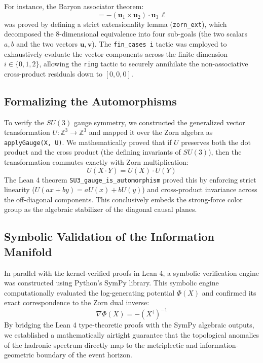 \documentclass[11pt,a4paper]{article}
\begin{document}
For instance, the Baryon associator theorem:
\begin{equation}
[N_{\text{upper}}(u_1), N_{\text{upper}}(u_2), N_{\text{upper}}(u_3)] = -(\mathbf{u}_1 \times \mathbf{u}_2) \cdot \mathbf{u}_3 \, \ell
\end{equation}
was proved by defining a strict extensionality lemma (\texttt{zorn\_ext}), which decomposed the 8-dimensional equivalence into four sub-goals (the two scalars $a,b$ and the two vectors $\mathbf{u},\mathbf{v}$). The \texttt{fin\_cases i} tactic was employed to exhaustively evaluate the vector components across the finite dimension $i \in \{0, 1, 2\}$, allowing the \texttt{ring} tactic to securely annihilate the non-associative cross-product residuals down to $[0,0,0]$.

\subsection{Formalizing the Automorphisms}
To verify the $SU(3)$ gauge symmetry, we constructed the generalized vector transformation $U: \mathbb{Z}^3 \to \mathbb{Z}^3$ and mapped it over the Zorn algebra as \texttt{applyGauge(X, U)}. We mathematically proved that if $U$ preserves both the dot product and the cross product (the defining invariants of $SU(3)$), then the transformation commutes exactly with Zorn multiplication:
\begin{equation}
U(X \cdot Y) = U(X) \cdot U(Y)
\end{equation}
The Lean 4 theorem \texttt{SU3\_gauge\_is\_automorphism} proved this by enforcing strict linearity ($U(ax+by) = aU(x)+bU(y)$) and cross-product invariance across the off-diagonal components. This conclusively embeds the strong-force color group as the algebraic stabilizer of the diagonal causal planes.

\subsection{Symbolic Validation of the Information Manifold}
In parallel with the kernel-verified proofs in Lean 4, a symbolic verification engine was constructed using Python's SymPy library. This symbolic engine computationally evaluated the log-generating potential $\Phi(X)$ and confirmed its exact correspondence to the Zorn dual inverse:
\begin{equation}
\nabla \Phi(X) = -(X^\dagger)^{-1}
\end{equation}
By bridging the Lean 4 type-theoretic proofs with the SymPy algebraic outputs, we established a mathematically airtight guarantee that the topological anomalies of the hadronic spectrum directly map to the metriplectic and information-geometric boundary of the event horizon.
\end{document}
